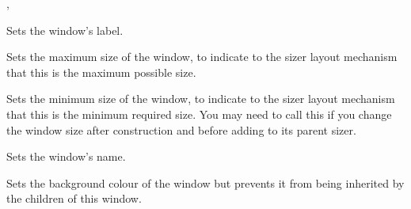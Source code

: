 
,\rtfsp
{}



\label{wxwindowsetlabel}


Sets the window's label.






\label{wxwindowsetmaxsize}


Sets the maximum size of the window, to indicate to the sizer layout mechanism
that this is the maximum possible size.

\label{wxwindowsetminsize}


Sets the minimum size of the window, to indicate to the sizer layout mechanism
that this is the minimum required size. You may need to call this
if you change the window size after construction and before adding
to its parent sizer.

\label{wxwindowsetname}


Sets the window's name.






\label{wxwindowsetownbackgroundcolour}


Sets the background colour of the window but prevents it from being inherited
by the children of this window.


